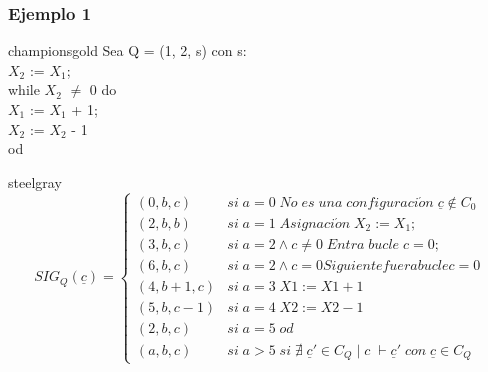 \documentclass[xcolor=table]{beamer}
\begin{document}
\begin{frame}[fragile]\frametitle{Ejemplo 1} \footnotesize  


        \begin{colorblock}[black]{championsgold}{}\scriptsize
        Sea Q = (1, 2, s) con s: \\
        \hspace{0.5cm}   $X_2$ := $X_1$;\\
        \hspace{0.5cm}   while $X_2$ $\neq$ 0 do \\
        \hspace{0.75cm}    $X_1$ := $X_1$ + 1;\\
        \hspace{0.75cm}    $X_2$ := $X_2$ - 1\\
        \hspace{0.5cm}  od
        \end{colorblock}

    \begin{colorblock}[white]{steelgray}{}\tiny
       \scriptsize\begin{equation*} SIG_Q(\underline{c}) = 
        \begin{cases} 
                (0,b,c)    & si\; a =0  \;No\;es\; una\; configuraci\acute{o}n \;\underline{c} \notin C_0\\
                (2,b,b)    & si\; a =1  \;Asignaci\acute{o}n\; X_2 := X_1;\\
                (3,b,c)    & si\; a = 2 \wedge c \neq 0  \;Entra\; bucle\; c=0;\\
                (6,b,c)    & si\; a = 2 \wedge c = 0 Siguiente fuera bucle c=0\\
                (4,b+1,c)  & si\; a = 3 \;X1 := X1 + 1\\
                (5,b,c-1)  & si\; a = 4 \;X2 := X2 - 1\\
                (2,b,c)    & si\; a = 5 \;od\\
                (a,b,c)    & si\; a > 5 \;si  \;\nexists\; \underline{c}' \in C_Q\; |\;  c\; \vdash  \underline{c}'\; con \;\underline{c} \in C_Q
        \end{cases} \end{equation*}   
        \end{colorblock}

\end{frame}
\end{document}
